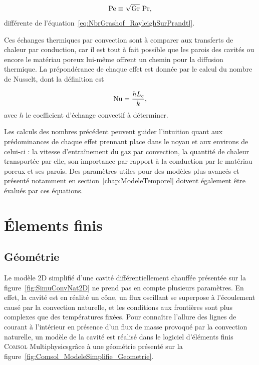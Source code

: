 \begin{equation}
	\mathrm{Pe} \equiv \sqrt{\mathrm{Gr}}~\mathrm{Pr},
	\label{eq:NbrPeclet_GrashofFoisPrandtl}
\end{equation}
différente de l'équation~\eqref{eq:NbrGrashof_RayleighSurPrandtl}.\medskip

Ces échanges thermiques par convection sont à comparer aux transferts de chaleur par conduction, car il est tout à fait possible que les parois des cavités ou encore le matériau poreux lui-même offrent un chemin pour la diffusion thermique. La prépondérance de chaque effet est donnée par le calcul du nombre de Nusselt, dont la définition est

\begin{equation}
	\mathrm{Nu} = \frac{h L_c}{k},
\end{equation}
avec $h$ le coefficient d'échange convectif à déterminer.\bigskip

Les calculs des nombres précédent peuvent guider l'intuition quant aux prédominances de chaque effet prennant place dans le noyau et aux environs de celui-ci : la vitesse d'entraînement du gaz par convection, la quantité de chaleur transportée par elle, son importance par rapport à la conduction par le matériau poreux et ses parois. Des paramètres utiles pour des modèles plus avancés et présenté notamment en section~\ref{chap:ModeleTemporel} doivent également être évalués par ces équations.

\section{\'Elements finis}\label{chap:FEM}
\subsection{Géométrie}
Le modèle 2D simplifié d'une cavité différentiellement chauffée présentée sur la figure~\ref{fig:SimuConvNat2D} ne prend pas en compte plusieurs paramètres. En effet, la cavité est en réalité un cône, un flux oscillant se superpose à l'écoulement causé par la convection naturelle, et les conditions aux frontières sont plus complexes que des températures fixées. Pour connaître l'allure des lignes de courant à l'intérieur en présence d'un flux de masse provoqué par la convection naturelle, un modèle de la cavité est réalisé dans le logiciel d'éléments finis \textsc{Comsol} Multiphysics\textss\textregistered grâce à une géométrie présenté sur la figure~\ref{fig:Comsol_ModeleSimplifie_Geometrie}.


